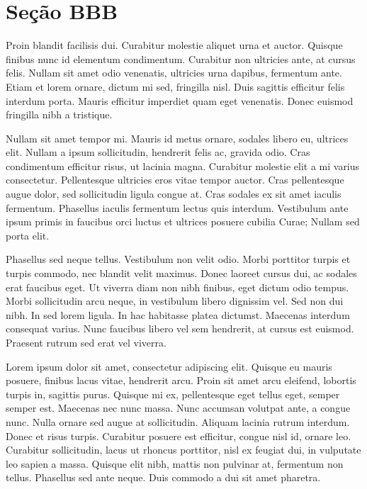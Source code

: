 \documentclass{article}
\begin{document}
	\section{Seção BBB}
	
	
	Proin blandit facilisis dui. Curabitur molestie aliquet urna et auctor. Quisque finibus nunc id elementum condimentum. Curabitur non ultricies ante, at cursus felis. Nullam sit amet odio venenatis, ultricies urna dapibus, fermentum ante. Etiam et lorem ornare, dictum mi sed, fringilla nisl. Duis sagittis efficitur felis interdum porta. Mauris efficitur imperdiet quam eget venenatis. Donec euismod fringilla nibh a tristique.
	
	Nullam sit amet tempor mi. Mauris id metus ornare, sodales libero eu, ultrices elit. Nullam a ipsum sollicitudin, hendrerit felis ac, gravida odio. Cras condimentum efficitur risus, ut lacinia magna. Curabitur molestie elit a mi varius consectetur. Pellentesque ultricies eros vitae tempor auctor. Cras pellentesque augue dolor, sed sollicitudin ligula congue at. Cras sodales ex sit amet iaculis fermentum. Phasellus iaculis fermentum lectus quis interdum. Vestibulum ante ipsum primis in faucibus orci luctus et ultrices posuere cubilia Curae; Nullam sed porta elit.
	
	Phasellus sed neque tellus. Vestibulum non velit odio. Morbi porttitor turpis et turpis commodo, nec blandit velit maximus. Donec laoreet cursus dui, ac sodales erat faucibus eget. Ut viverra diam non nibh finibus, eget dictum odio tempus. Morbi sollicitudin arcu neque, in vestibulum libero dignissim vel. Sed non dui nibh. In sed lorem ligula. In hac habitasse platea dictumst. Maecenas interdum consequat varius. Nunc faucibus libero vel sem hendrerit, at cursus est euismod. Praesent rutrum sed erat vel viverra. 
	
	Lorem ipsum dolor sit amet, consectetur adipiscing elit. Quisque eu mauris posuere, finibus lacus vitae, hendrerit arcu. Proin sit amet arcu eleifend, lobortis turpis in, sagittis purus. Quisque mi ex, pellentesque eget tellus eget, semper semper est. Maecenas nec nunc massa. Nunc accumsan volutpat ante, a congue nunc. Nulla ornare sed augue at sollicitudin. Aliquam lacinia rutrum interdum. Donec et risus turpis. Curabitur posuere est efficitur, congue nisl id, ornare leo. Curabitur sollicitudin, lacus ut rhoncus porttitor, nisl ex feugiat dui, in vulputate leo sapien a massa. Quisque elit nibh, mattis non pulvinar at, fermentum non tellus. Phasellus sed ante neque. Duis commodo a dui sit amet pharetra.
	
\end{document}
